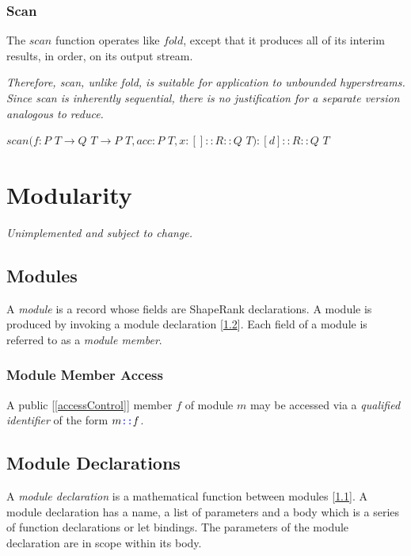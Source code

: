 \documentclass{article}
\begin{document}
\subsubsection{Scan}
\label{scan}

The $scan$ function operates like $fold$, except that it produces all of its interim results, in order, on its output stream. 

{\em 
Therefore, scan, unlike fold, is suitable for application to unbounded hyperstreams. Since scan is inherently sequential, there is no justification for a separate version analogous to reduce.
}

$scan(f: P $ $T \to{} Q $ $T \to{} P $ $T, acc: P $ $T, x:[]::R::Q $ $T):[d]::R::Q $ $T$

\section{Modularity}
\label{modularity}


{\em
Unimplemented and subject to change.
}


\subsection{Modules}
\label{modules}

A {\em module} is a record whose fields are ShapeRank declarations. A module is produced by invoking a module declaration [\ref{moduleDeclarations}].
Each field of a module is referred to as a {\em module member}.

\subsubsection{Module Member Access}
\label{moduleMemberAccess}

A public [\ref{accessControl}] member  $f$ of module $m$ may be accessed via a {\em qualified identifier} of the form $m \texttt{\color{blue} ::}{} f$.




\subsection{Module Declarations}
\label{moduleDeclarations}

A {\em module declaration} is a mathematical function between modules [\ref{modules}].  A module declaration has a name, a list of parameters and a body which is a series of function declarations or let bindings.  The parameters  of the module declaration are in scope within its body.
\end{document}
